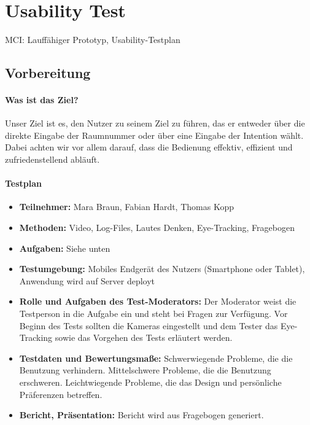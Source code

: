 \chapter{Usability Test}
MCI: Lauffähiger Prototyp, Usability-Testplan

\section{Vorbereitung}

\subsubsection*{Was ist das Ziel?}
Unser Ziel ist es, den Nutzer zu seinem Ziel zu führen, das er entweder über die direkte Eingabe der Raumnummer oder über eine Eingabe der Intention wählt.
Dabei achten wir vor allem darauf, dass die Bedienung effektiv, effizient und zufriedenstellend abläuft.
\subsubsection*{Testplan}
\begin{itemize}
\item \textbf{Teilnehmer:} Mara Braun, Fabian Hardt, Thomas Kopp
\item \textbf{Methoden:} Video, Log-Files, Lautes Denken, Eye-Tracking, Fragebogen
\item \textbf{Aufgaben:} Siehe unten
\item \textbf{Testumgebung:} Mobiles Endgerät des Nutzers (Smartphone oder Tablet), Anwendung wird auf Server deployt
\item \textbf{Rolle und Aufgaben des Test-Moderators:} Der Moderator weist die Testperson in die Aufgabe ein und steht bei Fragen zur Verfügung. Vor Beginn des Tests sollten die Kameras eingestellt und dem Tester das Eye-Tracking sowie das Vorgehen des Tests erläutert werden.
\item \textbf{Testdaten und Bewertungsmaße:} Schwerwiegende Probleme, die die Benutzung verhindern. Mittelschwere Probleme, die die Benutzung erschweren. Leichtwiegende Probleme, die das Design und persönliche Präferenzen betreffen.
\item \textbf{Bericht, Präsentation:} Bericht wird aus Fragebogen generiert.

\end{itemize}
